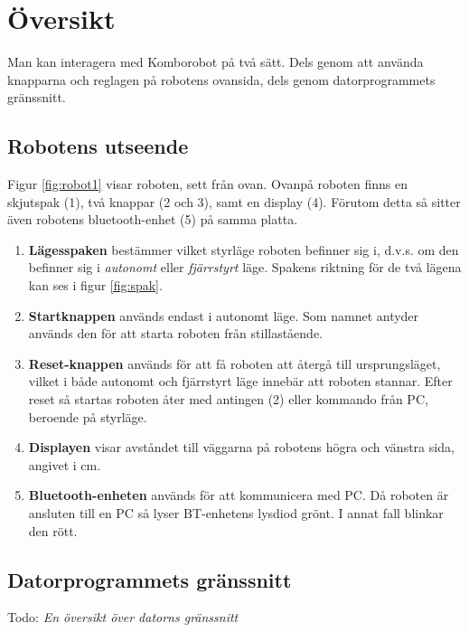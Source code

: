 
%
%


\section{Översikt}

Man kan interagera med Komborobot på två sätt. Dels genom att använda knapparna och reglagen på robotens ovansida, dels genom datorprogrammets gränssnitt. 

\subsection{Robotens utseende}

Figur \ref{fig:robot1} visar roboten, sett från ovan. Ovanpå roboten finns en skjutspak (1), två knappar (2 och 3),  samt en display (4).   Förutom detta så sitter även robotens bluetooth-enhet (5) på samma platta. 


\begin{enumerate}
\item{\bf Lägesspaken} bestämmer vilket styrläge roboten befinner sig i, d.v.s. om den befinner sig i \emph{autonomt} eller \emph{fjärrstyrt} läge. Spakens riktning för de två lägena kan ses i figur \ref{fig:spak}.
\item {\bf Startknappen} används endast i autonomt läge. Som namnet antyder används den för att starta roboten från stillastående. 
\item{\bf Reset-knappen} används för att få roboten att återgå till ursprungsläget, vilket i både autonomt och fjärrstyrt läge innebär att roboten stannar. Efter reset så startas roboten åter med antingen (2) eller kommando från PC, beroende på styrläge.
\item{\bf Displayen} visar avståndet till väggarna på robotens högra och vänstra sida, angivet i cm. 
\item{\bf Bluetooth-enheten} används för att kommunicera med PC. Då roboten är ansluten till en PC så lyser BT-enhetens lysdiod grönt. I annat fall blinkar den rött. 
\end{enumerate}


\subsection{Datorprogrammets gränssnitt}

Todo: \emph{En översikt över datorns gränssnitt}